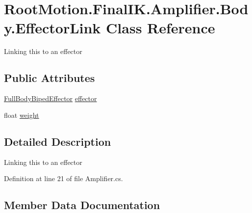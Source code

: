 \hypertarget{class_root_motion_1_1_final_i_k_1_1_amplifier_1_1_body_1_1_effector_link}{}\section{Root\+Motion.\+Final\+I\+K.\+Amplifier.\+Body.\+Effector\+Link Class Reference}
\label{class_root_motion_1_1_final_i_k_1_1_amplifier_1_1_body_1_1_effector_link}


Linking this to an effector  


\subsection*{Public Attributes}
\begin{DoxyCompactItemize}
\item 
\mbox{\hyperlink{namespace_root_motion_1_1_final_i_k_ae0dd2058c7667b6f132c11a6b860c14a}{Full\+Body\+Biped\+Effector}} \mbox{\hyperlink{class_root_motion_1_1_final_i_k_1_1_amplifier_1_1_body_1_1_effector_link_ace91b4255d68c8c1fa660e8211ac302e}{effector}}
\item 
float \mbox{\hyperlink{class_root_motion_1_1_final_i_k_1_1_amplifier_1_1_body_1_1_effector_link_af879e467ede02f43f1b8abb2367a8bc2}{weight}}
\end{DoxyCompactItemize}


\subsection{Detailed Description}
Linking this to an effector 



Definition at line 21 of file Amplifier.\+cs.



\subsection{Member Data Documentation}
\mbox{\label{class_root_motion_1_1_final_i_k_1_1_amplifier_1_1_body_1_1_effector_link_ace91b4255d68c8c1fa660e8211ac302e}} 
